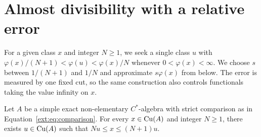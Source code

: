 \section{Almost divisibility with a relative error}
\label{ext:sec:divisibility}

For a given class $x$ and integer $N\ge1$, we seek a single class $u$
with $\varphi(x)/(N+1)<\varphi(u)<\varphi(x)/N$ whenever
$0<\varphi(x)<\infty$. We choose $s$ between $1/(N+1)$ and $1/N$
and approximate $s\varphi(x)$ from below. The error is measured by one
fixed cut, so the same construction also controls functionals taking the
value infinity on $x$.

\begin{theorem}
\label{ext:thm:divisibility}
Let $A$ be a simple exact non-elementary $C^*$-algebra with strict
comparison as in Equation~\eqref{ext:eq:comparison}.
For every $x\in\mathrm{Cu}(A)$ and integer $N\ge1$, there exists
$u\in\mathrm{Cu}(A)$ such that $Nu\le x\le(N+1)u$.
\end{theorem}

